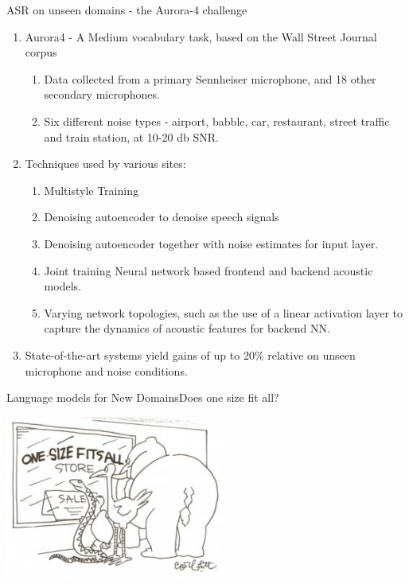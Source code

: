 \begin{frame}{ASR on unseen domains - the Aurora-4 challenge}

\begin{enumerate}
\item Aurora4 - A Medium vocabulary task, based on the Wall Street Journal corpus
\begin{enumerate}
\item Data collected from a primary Sennheiser microphone, and 18 other secondary microphones.
\item Six different noise types - airport, babble, car, restaurant, street traffic and train station, at 10-20 db SNR.
\end{enumerate}
\item Techniques used by various sites:
\begin{enumerate}
\item Multistyle Training
\item Denoising autoencoder to denoise speech signals
\item Denoising autoencoder together with noise estimates for input layer.
\item Joint training Neural network based frontend and backend acoustic models. 
\item Varying network topologies, such as the use of a linear activation layer to capture the dynamics of acoustic features for backend NN.
\end{enumerate}
\item State-of-the-art systems yield gains of up to 20\% relative on unseen microphone and noise conditions.
\end{enumerate}
\end{frame}


\begin{frame} {Language models for New Domains}{Does one size fit all?}
  \begin{center}
    \includegraphics[width=72mm]{figures/onesize.pdf}
  \end{center}
\end{frame}

